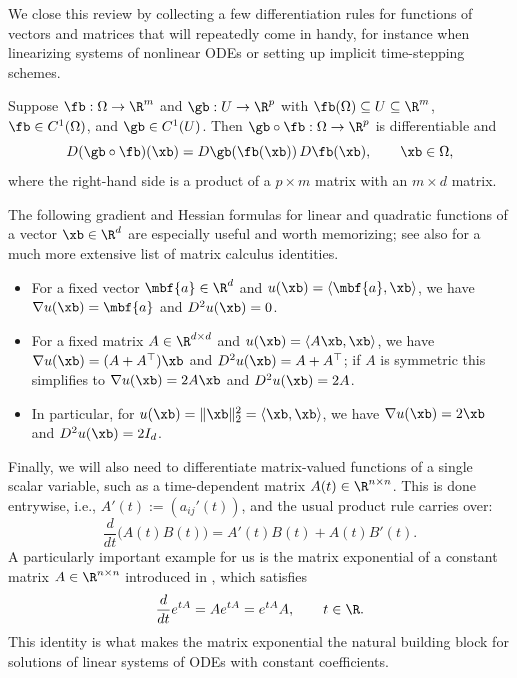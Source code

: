 We close this review by collecting a few differentiation rules for
functions of vectors and matrices that will repeatedly come in handy,
for instance when linearizing systems of nonlinear ODEs or setting up
implicit time-stepping schemes.

\begin{lemma}
    Suppose $\fb: \Omega \to \R^m$ and $\gb: U \to \R^p$ with $\fb(\Omega)
    \subseteq U \subseteq \R^m$, $\fb \in C^1(\Omega)$, and $\gb \in
    C^1(U)$. Then $\gb \circ \fb: \Omega \to \R^p$ is differentiable and
    \begin{equation*}
        D(\gb \circ \fb)(\xb) = D\gb(\fb(\xb)) \, D\fb(\xb),
        \qquad \xb \in \Omega,
    \end{equation*}
    where the right-hand side is a product of a $p \times m$ matrix with
    an $m \times d$ matrix.
\end{lemma}

The following gradient and Hessian formulas for linear and quadratic
functions of a vector $\xb \in \R^d$ are especially useful and worth
memorizing; see also \cite{matrixcookbook} for a much more extensive
list of matrix calculus identities.

\begin{itemize}
    \item For a fixed vector $\mbf{a} \in \R^d$ and $u(\xb) = \langle \mbf{a},
    \xb \rangle$, we have $\nabla u(\xb) = \mbf{a}$ and $D^2 u(\xb) = 0$.
    \item For a fixed matrix $A \in \R^{d \times d}$ and $u(\xb) =
    \langle A \xb, \xb \rangle$, we have $\nabla u(\xb) = (A + A^\top)
    \xb$ and $D^2 u(\xb) = A + A^\top$; if $A$ is symmetric this
    simplifies to $\nabla u(\xb) = 2A\xb$ and $D^2 u(\xb) = 2A$.
    \item In particular, for $u(\xb) = \|\xb\|_2^2 = \langle \xb, \xb
    \rangle$, we have $\nabla u(\xb) = 2\xb$ and $D^2 u(\xb) = 2I_d$.
\end{itemize}

Finally, we will also need to differentiate matrix-valued functions of
a single scalar variable, such as a time-dependent matrix $A(t) \in
\R^{n \times n}$. This is done entrywise, i.e., $A'(t) := (a_{ij}'(t))$,
and the usual product rule carries over:
\begin{equation*}
    \frac{d}{dt} \big( A(t) B(t) \big) = A'(t) B(t) + A(t) B'(t).
\end{equation*}
A particularly important example for us is the matrix exponential of a
constant matrix $A \in \R^{n \times n}$ introduced in
, which satisfies
\begin{equation*}
    \frac{d}{dt} e^{tA} = A e^{tA} = e^{tA} A, \qquad t \in \R.
\end{equation*}
This identity is what makes the matrix exponential the natural building
block for solutions of linear systems of ODEs with constant
coefficients.



